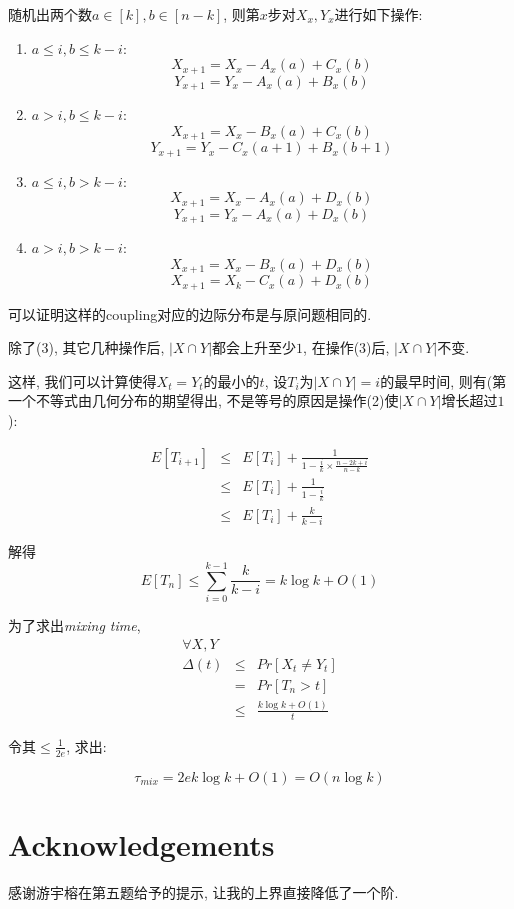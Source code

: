\documentclass[paper=a4, fontsize=11pt]{scrartcl} %
\numberwithin{figure}{section} %
\numberwithin{table}{section} %
\begin{document}
\begin{enumerate}[(a)]
	随机出两个数$a\in[k], b\in[n-k]$, 则第$x$步对$X_x,Y_x$进行如下操作:
	\begin{enumerate}[(1)]
		\item $a \leq i, b \leq k - i$:
				$$X_{x+1} = X_{x} - A_{x}(a) + C_{x}(b)$$
				$$Y_{x+1} = Y_{x} - A_{x}(a) + B_{x}(b)$$
		\item $a > i, b \leq k - i$: 
				$$X_{x+1} = X_{x} - B_{x}(a) + C_{x}(b)$$
				$$Y_{x+1} = Y_{x} - C_{x}(a+1) + B_{x}(b+1)$$
		\item $a \leq i, b > k - i$:
				$$X_{x+1} = X_{x} - A_{x}(a) + D_{x}(b)$$
				$$Y_{x+1} = Y_{x} - A_{x}(a) + D_{x}(b)$$
		\item $a > i, b > k - i$: 
				$$X_{x+1} = X_{x} - B_{x}(a) + D_{x}(b)$$
				$$X_{x+1} = X_{k} - C_{x}(a) + D_{x}(b)$$
	\end{enumerate}

	可以证明这样的coupling对应的边际分布是与原问题相同的.

	除了(3), 其它几种操作后, $|X\cap Y|$都会上升至少$1$, 在操作(3)后, $|X\cap Y|$不变.

	这样, 我们可以计算使得$X_t = Y_t$的最小的$t$, 设$T_i$为$|X\cap Y| = i$的最早时间, 则有(第一个不等式由几何分布的期望得出, 不是等号的原因是操作(2)使$|X\cap Y|$增长超过$1$):

	\begin{eqnarray*}
		E[T_{i+1}] & \leq & E[T_{i}] + \frac{1}{1 - \frac{i}{k}\times\frac{n-2k+i}{n-k}} \\
				   & \leq & E[T_{i}] + \frac{1}{1 - \frac{i}{k}}\\
				   & \leq & E[T_{i}] + \frac{k}{k - i}
	\end{eqnarray*}

	解得$$E[T_n] \leq \sum_{i=0}^{k - 1} \frac{k}{k-i} = k \log k + O(1)$$

	为了求出\textit{mixing time}, 
	\begin{eqnarray*}
		\forall X, Y & & \\
		\Delta(t) 	& \leq & \textit{Pr}\left[
			X_t\not= Y_t
		\right]	 \\ 
		& = & \textit{Pr}\left[T_n > t\right] \\
		&\leq& \frac{k\log k + O(1)}{t} 
	\end{eqnarray*}

	令其$\leq\frac{1}{2e}$, 求出:

	$$\tau_{mix} = 2ek\log k + O(1) = O(n\log k)$$
\end{enumerate}

\section*{Acknowledgements}
感谢游宇榕在第五题给予的提示, 让我的上界直接降低了一个阶.
\end{document}
